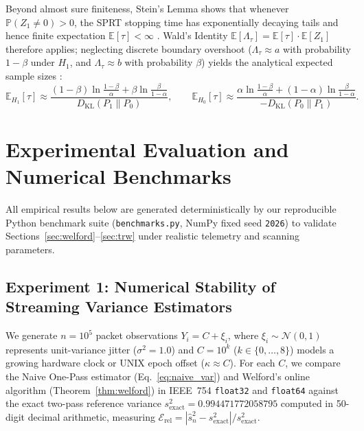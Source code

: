 \documentclass[oneside,noexaminfo,english]{sapthesis}
\numberwithin{equation}{section}
\numberwithin{figure}{section}
\numberwithin{table}{section}
\theoremstyle{compactplain}
\theoremstyle{compactdef}
\theoremstyle{compactrem}
\newcommand{\E}{\mathbb{E}}
\newcommand{\Prob}{\mathbb{P}}
\newcommand{\DKL}{D_{\mathrm{KL}}}
\begin{document}
Beyond almost sure finiteness, Stein's Lemma shows that whenever $\Prob(Z_1 \neq 0) > 0$, the SPRT stopping time has exponentially decaying tails and hence finite expectation $\E[\tau] < \infty$ \cite{wald1945}. Wald's Identity $\E[\Lambda_\tau] = \E[\tau]\cdot\E[Z_1]$ therefore applies; neglecting discrete boundary overshoot ($\Lambda_\tau \approx a$ with probability $1-\beta$ under $H_1$, and $\Lambda_\tau \approx b$ with probability $\beta$) yields the analytical expected sample sizes \cite{wald1945}:
\begin{equation}
    \label{eq:expected_tau}
    \E_{H_1}[\tau] \approx \frac{(1-\beta)\ln\frac{1-\beta}{\alpha} + \beta\ln\frac{\beta}{1-\alpha}}{\DKL(P_1 \parallel P_0)}, \qquad
    \E_{H_0}[\tau] \approx \frac{\alpha\ln\frac{1-\beta}{\alpha} + (1-\alpha)\ln\frac{\beta}{1-\alpha}}{-\DKL(P_0 \parallel P_1)}.
\end{equation}

\section{Experimental Evaluation and Numerical Benchmarks}
\label{sec:experiments}

All empirical results below are generated deterministically by our reproducible Python benchmark suite (\texttt{benchmarks.py}, NumPy fixed seed \texttt{2026}) to validate Sections~\ref{sec:welford}--\ref{sec:trw} under realistic telemetry and scanning parameters.

\subsection{Experiment 1: Numerical Stability of Streaming Variance Estimators}
We generate $n = 10^5$ packet observations $Y_i = C + \xi_i$, where $\xi_i \sim \mathcal{N}(0, 1)$ represents unit-variance jitter ($\sigma^2 = 1.0$) and $C = 10^k$ ($k \in \{0, \dots, 8\}$) models a growing hardware clock or UNIX epoch offset ($\kappa \approx C$). For each $C$, we compare the Naive One-Pass estimator (Eq.~\eqref{eq:naive_var}) and Welford's online algorithm (Theorem~\ref{thm:welford}) in IEEE~754 \texttt{float32} and \texttt{float64} against the exact two-pass reference variance $s_{\mathrm{exact}}^2 = 0.994471772058795$ computed in 50-digit decimal arithmetic, measuring $\mathcal{E}_{\mathrm{rel}} = |\hat{s}_n^2 - s_{\mathrm{exact}}^2| / s_{\mathrm{exact}}^2$.
\end{document}
